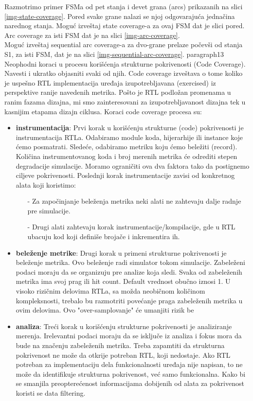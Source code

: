 \indent Razmotrimo primer FSMa od pet stanja i devet grana (arcs) prikazanih na slici \ref{img-state-coverage}. Pored svake grane nalazi se njoj odgovarajuća jednačina narednog stanja. Moguć izveštaj state coverage-a za ovaj FSM dat je slici pored.\\
\indent Arc coverage za isti FSM dat je na slici \ref{img-arc-coverage}.\\
\indent Moguć izveštaj sequential arc coverage-a za dvo-grane prelaze počevši od stanja S1, za isti FSM, dat je na slici \ref{img-sequential-arc-coverage}.
paragraph{13 Neophodni koraci u procesu korišćenja strukturne pokrivenosti (Code Coverage). Navesti i ukratko objasniti svaki od njih.}
\indent Code coverage izveštava o tome koliko je uspešno RTL implementacija uređaja izupotrebljavana (exercised) iz perspektive ranije navedenih metrika. Pošto je RTL podložan promenama u ranim fazama dizajna, mi smo zainteresovani za izupotrebljavanost dizajna tek u kasnijim etapama dizajn ciklusa. Koraci code coverage procesa su:
\begin{itemize}
\item \textbf{instrumentacija}: Prvi korak u korišćenju strukturne (code) pokrivenosti je instrumentacija RTLa. Odabiramo module koda, hijerarhije ili instance koje ćemo posmatrati. Sledeće, odabiramo metriku koju ćemo beležiti (record). Količina instrumentovanog koda i broj merenih metrika će odrediti stepen degradacije simulacije. Moramo ograničiti ova dva faktora tako da postignemo ciljeve pokrivenosti. Poslednji korak instrumentacije zavisi od konkretnog alata koji koristimo:
\begin{itemize}
\item[-] Za započinjanje beleženja metrika neki alati ne zahtevaju dalje radnje pre simulacije.
\item[-] Drugi alati zahtevaju korak instrumentacije/kompilacije, gde u RTL ubacuju kod koji definiše brojače i inkrementira ih.
\end{itemize}
\item \textbf{beleženje metrike}: Drugi korak u primeni strukturne pokrivenosti je beleženje metrika. Ovo beleženje radi simulator tokom simulacije. Zabeleženi podaci moraju da se organizuju pre analize koja sledi. Svaka od zabeleženih metrika ima svoj prag ili hit count. Default vrednost obučno iznosi 1. U visoko rizičnim delovima RTLa, sa možda neobičnom količinom kompleksnosti, trebalo bu razmotriti povećanje praga zabeleženih metrika u ovim delovima. Ovo "over-samplovanje" će umanjiti rizik be
\item \textbf{analiza}: Treći korak u korišćenju strukturne pokrivenosti je analiziranje merenja. Irelevantni podaci moraju da se isključe iz analiza i fokus mora da bude na značenju zabeleženih metrika. Treba zapamtiti da strukturna pokrivenost ne može da otkrije potreban RTL, koji nedostaje. Ako RTL potreban za implementaciju dela funkcionalnosti uređaja nije napisan, to ne može da identifikuje strukturna pokrivenost, već samo funkcionalna. Kako bi se smanjila preopterećenost informacijama dobijenih od alata za pokrivenost koristi se data filtering.
\end{itemize}
